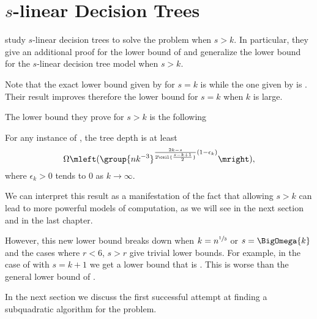 \section{$s$-linear Decision Trees}

\citet*{ailon:2005} study $s$-linear decision trees to solve the \kSUM
problem when $s > k$. In particular, they give an additional proof for the
 lower bound of \citet{erickson:1999} and
generalize the lower bound for the \(s\)-linear decision tree model when $s > k$.

Note that the exact lower bound given by \citet*{erickson:1999} for \(s = k\) is
 while the one given by
\citet*{ailon:2005} is . Their result
improves therefore the lower bound for \(s = k\) when \(k\) is large.

The lower bound they prove for \(s > k\) is the following
\begin{theorem}
For any instance of \kLDT, the tree depth is at least
\begin{displaymath}
\Omega\mleft(\group{nk^{-3}}^{\frac{2k-s}{2\ceil{\frac{s-k+1}{2}}}
(1-\epsilon_k) }\mright),
\end{displaymath}
where \(\epsilon_k > 0\) tends to \(0\) as \(k \to\infty\).
\end{theorem}

We can interpret this result as a manifestation of the fact that allowing \(s >
k\) can lead to more powerful models of computation, as we will see in the next
section and in the last chapter.

However, this new lower bound breaks down when
\(k = n^{\sfrac{1}{3}}\) or \(s = \BigOmega{k}\) and the cases where \(r <
6\), \(s > r\) give trivial lower bounds. For example, in the case
of \threeSUM with \(s = k + 1\) we get a lower bound that is . This is
worse than the general lower bound of .

In the next section we discuss the first successful attempt at finding
a subquadratic algorithm for the \threeSUM problem.
